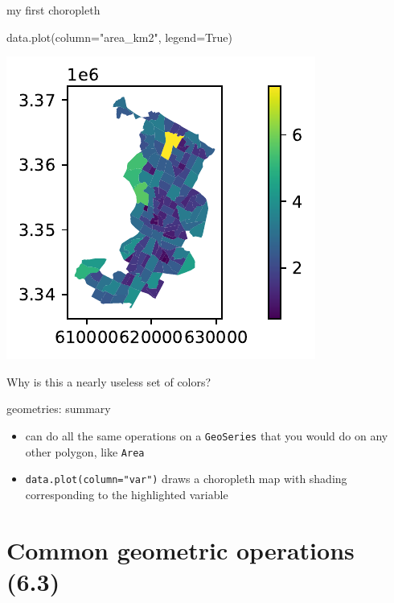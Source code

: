 \documentclass[
  ignorenonframetext,
]{beamer}
\newenvironment{Shaded}{\begin{snugshade}}{\end{snugshade}}
\newcommand{\NormalTok}[1]{\textcolor[rgb]{0.00,0.23,0.31}{#1}}
\newcommand{\OperatorTok}[1]{\textcolor[rgb]{0.37,0.37,0.37}{#1}}
\newcommand{\StringTok}[1]{\textcolor[rgb]{0.13,0.47,0.30}{#1}}
\newcommand{\VariableTok}[1]{\textcolor[rgb]{0.07,0.07,0.07}{#1}}
\providecommand{\tightlist}{%
  \setlength{\itemsep}{0pt}\setlength{\parskip}{0pt}}\usepackage{longtable,booktabs,array}
\begin{document}
\begin{frame}[fragile]{my first choropleth}
\label{my-first-choropleth}
\begin{Shaded}
\begin{Highlighting}[]
\NormalTok{data.plot(column}\OperatorTok{=}\StringTok{"area\_km2"}\NormalTok{, legend}\OperatorTok{=}\VariableTok{True}\NormalTok{)}
\end{Highlighting}
\end{Shaded}

\includegraphics{spatial_2_files/figure-beamer/cell-11-output-1.pdf}

Why is this a nearly useless set of colors?
\end{frame}

\begin{frame}[fragile]{geometries: summary}
\label{geometries-summary}
\begin{itemize}
\tightlist
\item
  can do all the same operations on a \texttt{GeoSeries} that you would
  do on any other polygon, like \texttt{Area}
\item
  \texttt{data.plot(column="var")} draws a choropleth map with shading
  corresponding to the highlighted variable
\end{itemize}
\end{frame}

\section{Common geometric operations
(6.3)}\label{common-geometric-operations-6.3}
\end{document}
